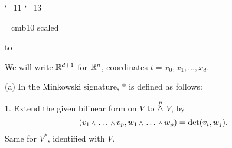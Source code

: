 

\loadeusm

\catcode`\@=11
\def\logo@{}
\catcode`\@=13

\NoRunningHeads

\font\boldtitlefont=cmb10 scaled

\def\dspace{\lineskip=2pt\baselineskip=18pt\lineskiplimit=0pt}
\def\wedgeop{\operatornamewithlimits{\wedge}\limits}
\def\w{{\mathchoice{\,{\scriptstyle\wedge}\,}
  {{\scriptstyle\wedge}}
  {{\scriptscriptstyle\wedge}}{{\scriptscriptstyle\wedge}}}}
\def\Le{{\mathchoice{\,{\scriptstyle\le}\,}
  {\,{\scriptstyle\le}\,}
  {\,{\scriptscriptstyle\le}\,}{\,{\scriptscriptstyle\le}\,}}}
\def\Ge{{\mathchoice{\,{\scriptstyle\ge}\,}
  {\,{\scriptstyle\ge}\,}
  {\,{\scriptscriptstyle\ge}\,}{\,{\scriptscriptstyle\ge}\,}}}
\def\vrulesub#1{\hbox{\,\vrule height7pt depth5pt\,}_{#1}}
\def\mapright#1{\smash{\mathop{\,\longrightarrow\,}%
     \limits^{#1}}}

\def\Adot{\Dot{A}}
\def\Bdot{\Dot{B}}
\def\phidot{\Dot{\phi}}

\def\dbR{{\Bbb R}}
\def\dbZ{{\Bbb Z}} 


\def\scr#1{{\fam\eusmfam\relax#1}}

\def\scrA{{\scr A}}   \def\scrB{{\scr B}}
\def\scrC{{\scr C}}   \def\scrD{{\scr D}}
\def\scrE{{\scr E}}   \def\scrF{{\scr F}}
\def\scrG{{\scr G}}   \def\scrH{{\scr H}}
\def\scrI{{\scr I}}   \def\scrJ{{\scr J}}
\def\scrK{{\scr K}}   \def\scrL{{\scr L}}
\def\scrM{{\scr M}}   \def\scrN{{\scr N}}
\def\scrO{{\scr O}}   \def\scrP{{\scr P}}
\def\scrQ{{\scr Q}}   \def\scrR{{\scr R}}
\def\scrS{{\scr S}}   \def\scrT{{\scr T}}
\def\scrU{{\scr U}}   \def\scrV{{\scr V}}
\def\scrW{{\scr W}}   \def\scrX{{\scr X}}
\def\scrY{{\scr Y}}   \def\scrZ{{\scr Z}}



\document
{}
\smallskip
\hbox to \hsize{\hrulefill}

\bigskip
\dspace
We will write $\dbR^{d+1}$ for $\dbR^n$, coordinates
$t=x_0,x_1,\dotsc,x_d$.

\medskip\noindent
(a)\enspace
In the Minkowski signature, $*$ is defined as follows:

1.\enspace
Extend the given bilinear form on $V$ to $\wedgeop^{p}$
$V$, by
$$
(v_1\w\ldots\w v_p, w_1\w\ldots\w w_p)= \det(v_i,w_j).
$$
Same for $V^*$, identified with $V$.

